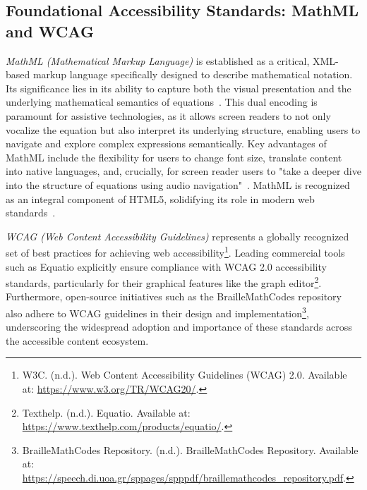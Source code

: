 \subsection{Foundational Accessibility Standards: MathML and WCAG}

\emph{MathML (Mathematical Markup Language)} is established as a critical, XML-based markup language specifically designed to describe mathematical notation. Its significance lies in its ability to capture both the visual presentation and the underlying mathematical semantics of equations~\cite{W3CMathML}\cite{W3CMathML3}\cite{W3CMathML4}\cite{W3CMathMLWeb}. This dual encoding is paramount for assistive technologies, as it allows screen readers to not only vocalize the equation but also interpret its underlying structure, enabling users to navigate and explore complex expressions semantically. Key advantages of MathML include the flexibility for users to change font size, translate content into native languages, and, crucially, for screen reader users to "take a deeper dive into the structure of equations using audio navigation"~\cite{W3CMathML}\cite{W3CMathML3}. MathML is recognized as an integral component of HTML5, solidifying its role in modern web standards~\cite{W3CMathMLWeb}.

\emph{WCAG (Web Content Accessibility Guidelines)} represents a globally recognized set of best practices for achieving web accessibility\footnote{W3C. (n.d.). Web Content Accessibility Guidelines (WCAG) 2.0. Available at: \url{https://www.w3.org/TR/WCAG20/}.}. Leading commercial tools such as Equatio explicitly ensure compliance with WCAG 2.0 accessibility standards, particularly for their graphical features like the graph editor\footnote{Texthelp. (n.d.). Equatio. Available at: \url{https://www.texthelp.com/products/equatio/}.}. Furthermore, open-source initiatives such as the BrailleMathCodes repository also adhere to WCAG guidelines in their design and implementation\footnote{BrailleMathCodes Repository. (n.d.). BrailleMathCodes Repository. Available at: \url{https://speech.di.uoa.gr/sppages/spppdf/braillemathcodes_repository.pdf}.}, underscoring the widespread adoption and importance of these standards across the accessible content ecosystem.

